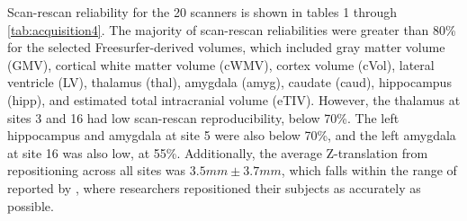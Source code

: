 Scan-rescan reliability for the 20 scanners is shown in tables 1 through \ref{tab:acquisition4}. The majority of scan-rescan reliabilities were greater than 80\% for the selected Freesurfer-derived volumes, which included gray matter volume (GMV), cortical white matter volume (cWMV), cortex volume (cVol), lateral ventricle (LV), thalamus (thal), amygdala (amyg), caudate (caud), hippocampus (hipp), and estimated total intracranial volume (eTIV). However, the thalamus at sites 3 and 16 had low scan-rescan reproducibility, below 70\%. The left hippocampus and amygdala at site 5 were also below 70\%, and the left amygdala at site 16 was also low, at 55\%. Additionally, the average Z-translation from repositioning across all sites was $3.5mm \pm 3.7mm$, which falls within the range of reported by \cite{Caramanos_2010}, where researchers repositioned their subjects as accurately as possible.

